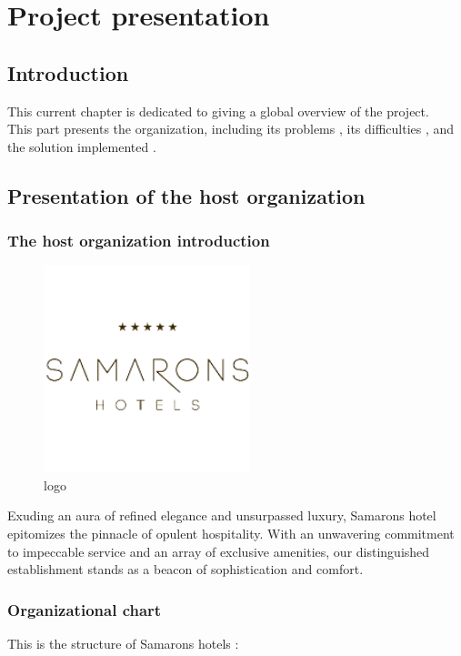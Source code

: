 \chapter{Project presentation}

\section{Introduction}
This current chapter is dedicated to giving a global overview of the project.  \\
This part presents the organization, including its problems , its difficulties , and the solution implemented .

\section{Presentation of the host organization  }

\subsection{The host organization introduction }
\begin{figure}[H]
   \centering
    \includegraphics[width=6cm,height=6cm]{images/hotel.png}
    \caption{logo}
    \label{Samarons hotels logo}
\end{figure}
Exuding an aura of refined elegance and unsurpassed luxury, Samarons hotel epitomizes the pinnacle of opulent hospitality. With an unwavering commitment to impeccable service and an array of exclusive amenities, our distinguished establishment stands as a beacon of sophistication and comfort.  

\subsection{Organizational chart}

This is the structure of Samarons hotels :

